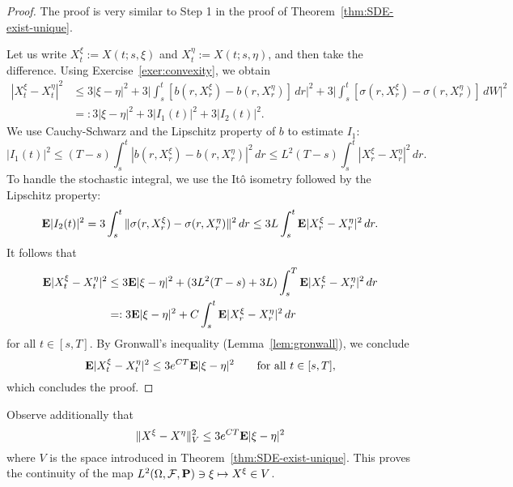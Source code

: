 \begin{proof}
	The proof is very similar to Step 1 in the proof of Theorem~\ref{thm:SDE-exist-unique}.
	
	Let us write $X_t^\xi := X(t;s,\xi)$ and $X_t^\eta := X(t;s,\eta)$, and then take the difference. Using Exercise~\ref{exer:convexity}, we obtain
	\begin{align*}
		|X_t^\xi-X_t^\eta|^2 &\le 3|\xi-\eta|^2 + 3\bigg|\int_s^t [b(r,X_r^\xi)-b(r,X_r^\eta)]\,dr\bigg|^2 + 3\bigg|\int_s^t [\sigma(r,X_r^\xi)-\sigma(r,X_r^\eta)]\,dW\bigg|^2 \\
		&=: 3|\xi-\eta|^2 + 3|I_1(t)|^2 + 3|I_2(t)|^2.
	\end{align*}
	We use Cauchy-Schwarz and the Lipschitz property of $b$ to estimate $I_1$:
	\begin{equation*}
		|I_1(t)|^2 \le (T-s)\int_s^t |b(r,X_r^\xi)-b(r,X_r^\eta)|^2\,dr \le L^2(T-s)\int_s^t |X_r^\xi-X_r^\eta|^2\,dr.
	\end{equation*}
	To handle the stochastic integral, we use the It\^{o} isometry followed by the Lipschitz property:
	\begin{equation*}
		\mathbf{E}|I_2(t)|^2 = 3\int_s^t \|\sigma(r,X_r^\xi)-\sigma(r,X_r^\eta)\|^2\,dr \le 3L\int_s^t \mathbf{E}|X_r^\xi - X_r^\eta|^2\,dr.
	\end{equation*}
	It follows that
	\begin{align*}
		\mathbf{E}|X_t^\xi - X_t^\eta|^2 &\le 3\mathbf{E}|\xi-\eta|^2 + (3L^2(T-s)+3L)\int_s^T \mathbf{E}|X_r^\xi - X_r^\eta|^2\,dr \\
		&=: 3\mathbf{E}|\xi-\eta|^2 + C\int_s^t \mathbf{E}|X_r^\xi - X_r^\eta|^2\,dr
	\end{align*}
	for all $t\in [s,T]$. By Gronwall's inequality (Lemma~\ref{lem:gronwall}), we conclude
	\begin{equation*}
		\mathbf{E}|X_t^\xi - X_t^\eta|^2 \le 3e^{CT} \mathbf{E}|\xi-\eta|^2 \qquad\text{for all }t\in [s,T],
	\end{equation*}
	which concludes the proof.
\end{proof}

Observe additionally that
\begin{equation*}
	\|X^\xi - X^\eta\|^2_V \le 3e^{CT}\mathbf{E}|\xi-\eta|^2
\end{equation*}
where $V$ is the space introduced in Theorem~\ref{thm:SDE-exist-unique}. This proves the continuity of the map $L^2(\Omega,\mathcal{F},\mathbf{P})\ni\xi\mapsto X^\xi \in V$.